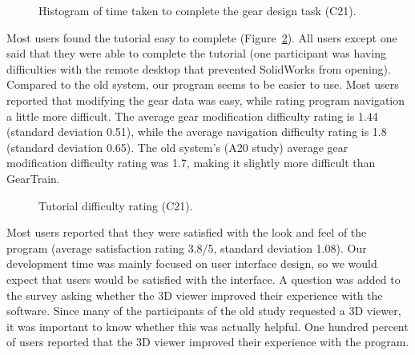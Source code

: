 \begin{doublespace}
\begin{figure}[htbp]
    \centering
{}
    \caption{Histogram of time taken to complete the gear design task (C21).}
    \label{fig:time_hist1}
\end{figure}

Most users found the tutorial easy to complete (Figure~\ref{fig:difficulty1}). All users except one said that they were able to complete the tutorial (one participant was having difficulties with the remote desktop that prevented SolidWorks from opening). Compared to the old system, our program seems to be easier to use. Most users reported that modifying the gear data was easy, while rating program navigation a little more difficult. The average gear modification difficulty rating is 1.44 (standard deviation 0.51), while the average navigation difficulty rating is 1.8 (standard deviation 0.65). The old system's (A20 study) average gear modification difficulty rating was 1.7, making it slightly more difficult than GearTrain.

\begin{figure}[htbp]
    \centering
    \caption{Tutorial difficulty rating (C21).}
    \label{fig:difficulty1}
\end{figure}

Most users reported that they were satisfied with the look and feel of the program (average satisfaction rating 3.8/5, standard deviation 1.08). Our development time was mainly focused on user interface design, so we would expect that users would be satisfied with the interface. A question was added to the survey asking whether the 3D viewer improved their experience with the software. Since many of the participants of the old study requested a 3D viewer, it was important to know whether this was actually helpful. One hundred percent of users reported that the 3D viewer improved their experience with the program.


\end{doublespace}

